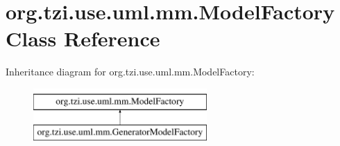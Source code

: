 \hypertarget{classorg_1_1tzi_1_1use_1_1uml_1_1mm_1_1_model_factory}{\section{org.\-tzi.\-use.\-uml.\-mm.\-Model\-Factory Class Reference}
\label{classorg_1_1tzi_1_1use_1_1uml_1_1mm_1_1_model_factory}
}
Inheritance diagram for org.\-tzi.\-use.\-uml.\-mm.\-Model\-Factory\-:\begin{figure}[H]
\begin{center}
\leavevmode
\includegraphics[height=2.000000cm]{classorg_1_1tzi_1_1use_1_1uml_1_1mm_1_1_model_factory}
\end{center}
\end{figure}
